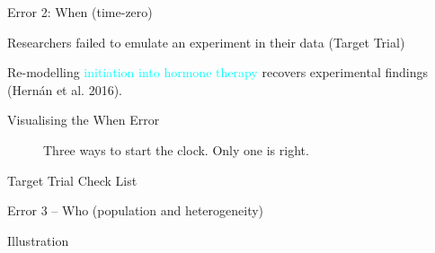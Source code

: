\documentclass[
  ignorenonframetext,
  aspectratio=169,
]{beamer}
\begin{document}
\begin{frame}{Error 2: When (time-zero)}
\begin{block}{Researchers failed to emulate an experiment in their data
(Target Trial)}
\begin{tcolorbox}
Re-modelling \textcolor{cyan}{initiation into hormone therapy} recovers
experimental findings (Hernán et al. 2016).

\end{tcolorbox}
\end{block}

\begin{block}{Visualising the When Error}
\label{visualising-the-when-error}
\begin{figure}


\caption{\label{fig-time-zero-3lines}Three ways to start the clock. Only
one is right.}

\end{figure}%
\end{block}

\begin{block}{Target Trial Check List}
\label{target-trial-check-list}
\begin{table}

\caption{\label{tbl-target-trial}Target-trial specification for the
hormone-therapy example.}


\end{table}%
\end{block}
\end{frame}

\begin{frame}{Error 3 -- Who (population and heterogeneity)}
\label{error-3-who-population-and-heterogeneity}
\begin{block}{Illustration}
\label{illustration}
\end{block}
\end{frame}
\end{document}
